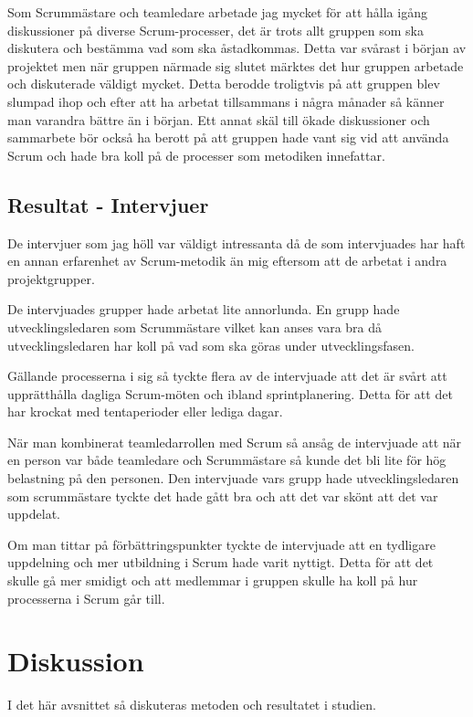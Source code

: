Som Scrummästare och teamledare arbetade jag mycket för att hålla igång diskussioner på diverse Scrum-processer, det är trots allt gruppen som ska diskutera och bestämma vad som ska åstadkommas. 
Detta var svårast i början av projektet men när gruppen närmade sig slutet märktes det hur gruppen arbetade och diskuterade väldigt mycket. 
Detta berodde troligtvis på att gruppen blev slumpad ihop och efter att ha arbetat tillsammans i några månader så känner man varandra bättre än i början. 
Ett annat skäl till ökade diskussioner och sammarbete bör också ha berott på att gruppen hade vant sig vid att använda Scrum och hade bra koll på de processer som metodiken innefattar.

\subsection{Resultat - Intervjuer}
De intervjuer som jag höll var väldigt intressanta då de som intervjuades har haft en annan erfarenhet av Scrum-metodik än mig eftersom att de arbetat i andra projektgrupper. 

De intervjuades grupper hade arbetat lite annorlunda. En grupp hade utvecklingsledaren som Scrummästare vilket kan anses vara bra då utvecklingsledaren har koll på vad som ska göras under utvecklingsfasen.

Gällande processerna i sig så tyckte flera av de intervjuade att det är svårt att upprätthålla dagliga Scrum-möten och ibland sprintplanering. Detta för att det har krockat med tentaperioder eller lediga dagar.

När man kombinerat teamledarrollen med Scrum så ansåg de intervjuade att när en person var både teamledare och Scrummästare så kunde det bli lite för hög belastning på den personen. 
Den intervjuade vars grupp hade utvecklingsledaren som scrummästare tyckte det hade gått bra och att det var skönt att det var uppdelat.

Om man tittar på förbättringspunkter tyckte de intervjuade att en tydligare uppdelning och mer utbildning i Scrum hade varit nyttigt. Detta för att det skulle gå mer smidigt och att medlemmar i gruppen skulle ha koll på hur processerna i Scrum går till.

\section{Diskussion}
I det här avsnittet så diskuteras metoden och resultatet i studien.

